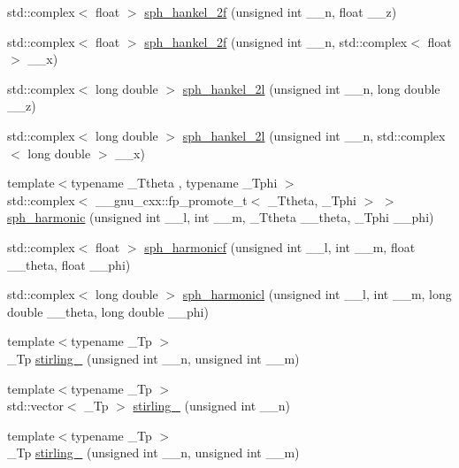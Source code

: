 \begin{DoxyCompactItemize}
\item 
std\+::complex$<$ float $>$ \hyperlink{group__mathsf__gnu_ga9496b81f94b8ba0162cf45df72be1e71}{sph\+\_\+hankel\+\_\+2f} (unsigned int \+\_\+\+\_\+n, float \+\_\+\+\_\+z)
\item 
std\+::complex$<$ float $>$ \hyperlink{group__mathsf__gnu_ga4c3194b71831b265811f987cbbf6e031}{sph\+\_\+hankel\+\_\+2f} (unsigned int \+\_\+\+\_\+n, std\+::complex$<$ float $>$ \+\_\+\+\_\+x)
\item 
std\+::complex$<$ long double $>$ \hyperlink{group__mathsf__gnu_ga6d3ead73a4f0bfeeb0aa1fd99daaf3b1}{sph\+\_\+hankel\+\_\+2l} (unsigned int \+\_\+\+\_\+n, long double \+\_\+\+\_\+z)
\item 
std\+::complex$<$ long double $>$ \hyperlink{group__mathsf__gnu_ga3d9d9aaceba455a5ddc79d178ee1cb6d}{sph\+\_\+hankel\+\_\+2l} (unsigned int \+\_\+\+\_\+n, std\+::complex$<$ long double $>$ \+\_\+\+\_\+x)
\item 
{\footnotesize template$<$typename \+\_\+\+Ttheta , typename \+\_\+\+Tphi $>$ }\\std\+::complex$<$ \+\_\+\+\_\+gnu\+\_\+cxx\+::fp\+\_\+promote\+\_\+t$<$ \+\_\+\+Ttheta, \+\_\+\+Tphi $>$ $>$ \hyperlink{group__mathsf__gnu_gacbff28988d5d36f0c3b3fe03d4f57896}{sph\+\_\+harmonic} (unsigned int \+\_\+\+\_\+l, int \+\_\+\+\_\+m, \+\_\+\+Ttheta \+\_\+\+\_\+theta, \+\_\+\+Tphi \+\_\+\+\_\+phi)
\item 
std\+::complex$<$ float $>$ \hyperlink{group__mathsf__gnu_ga062b1156f5646fe42719439bb3dcc9e5}{sph\+\_\+harmonicf} (unsigned int \+\_\+\+\_\+l, int \+\_\+\+\_\+m, float \+\_\+\+\_\+theta, float \+\_\+\+\_\+phi)
\item 
std\+::complex$<$ long double $>$ \hyperlink{group__mathsf__gnu_ga414c8374b4579aa14e38f5401304b6fa}{sph\+\_\+harmonicl} (unsigned int \+\_\+\+\_\+l, int \+\_\+\+\_\+m, long double \+\_\+\+\_\+theta, long double \+\_\+\+\_\+phi)
\item 
{\footnotesize template$<$typename \+\_\+\+Tp $>$ }\\\+\_\+\+Tp \hyperlink{group__mathsf__gnu_ga2b955dac7d2c5125f2091eaeb25c8ad2}{stirling\+\_} (unsigned int \+\_\+\+\_\+n, unsigned int \+\_\+\+\_\+m)
\item 
{\footnotesize template$<$typename \+\_\+\+Tp $>$ }\\std\+::vector$<$ \+\_\+\+Tp $>$ \hyperlink{group__mathsf__gnu_gaff3d42b2ec5364d24c1ad0ef4b374a8d}{stirling\+\_} (unsigned int \+\_\+\+\_\+n)
\item 
{\footnotesize template$<$typename \+\_\+\+Tp $>$ }\\\+\_\+\+Tp \hyperlink{group__mathsf__gnu_ga3761c0e467cbe45cbda66a4e796adcd3}{stirling\+\_} (unsigned int \+\_\+\+\_\+n, unsigned int \+\_\+\+\_\+m)

\end{DoxyCompactItemize}
